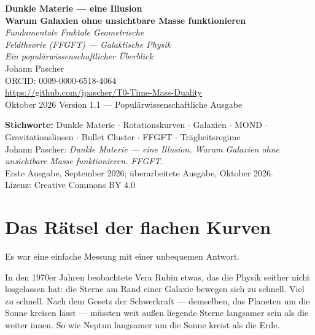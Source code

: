 \documentclass[11pt,oneside]{book}
\begin{document}
\frontmatter
\pagestyle{fancy}

\begin{titlepage}
  \centering\vspace*{1.5cm}
  {\Huge\bfseries\color{blue!70!black}
    Dunkle Materie — eine Illusion}\\[0.6cm]
  {\Large\bfseries\color{blue!40!black}
    Warum Galaxien ohne unsichtbare Masse funktionieren}\\[1cm]
  {\LARGE\itshape Fundamentale Fraktale Geometrische\\[0.2cm]
    Feldtheorie (FFGFT) — Galaktische Physik}\\[0.5cm]
  {\large\itshape Ein populärwissenschaftlicher Überblick}\\[2cm]
  {\large Johann Pascher}\\[0.3cm]
  {\normalsize ORCID: 0009-0000-6518-4064}\\[0.3cm]
  {\normalsize\url{https://github.com/jpascher/T0-Time-Mass-Duality}}\\[1.5cm]
  {\normalsize Oktober 2026}
  \vfill{\small Version 1.1 --- Populärwissenschaftliche Ausgabe}
\end{titlepage}

\newpage\thispagestyle{empty}%
{\small\noindent\textbf{Stichworte:} Dunkle Materie $\cdot$
Rotationskurven $\cdot$ Galaxien $\cdot$ MOND $\cdot$
Gravitationslinsen $\cdot$ Bullet Cluster $\cdot$ FFGFT $\cdot$
Trägheitsregime\\[1em]
\noindent Johann Pascher: \textit{Dunkle Materie — eine Illusion.
Warum Galaxien ohne unsichtbare Masse funktionieren. FFGFT.}\\
Erste Ausgabe, September 2026; überarbeitete Ausgabe, Oktober 2026.\\[0.6em]
\noindent Lizenz: Creative Commons BY 4.0}

\tableofcontents
\mainmatter

\chapter{Das Rätsel der flachen Kurven}

Es war eine einfache Messung mit einer unbequemen Antwort.

In den 1970er Jahren beobachtete Vera Rubin etwas, das die
Physik seither nicht losgelassen hat: die Sterne am Rand einer
Galaxie bewegen sich zu schnell. Viel zu schnell. Nach dem
Gesetz der Schwerkraft — demselben, das Planeten um die Sonne
kreisen lässt — müssten weit außen liegende Sterne langsamer
sein als die weiter innen. So wie Neptun langsamer um die Sonne
kreist als die Erde.
\end{document}
